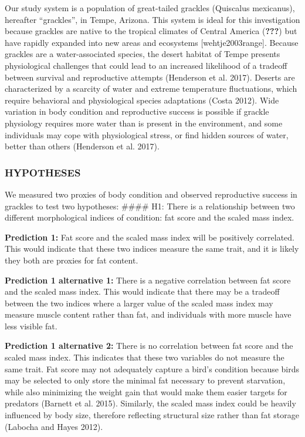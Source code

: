 \documentclass[
]{article}
\begin{document}
Our study system is a population of great-tailed grackles (Quiscalus
mexicanus), hereafter ``grackles'', in Tempe, Arizona. This system is
ideal for this investigation because grackles are native to the tropical
climates of Central America ({\textbf{???}}) but have rapidly expanded
into new areas and ecosystems {[}wehtje2003range{]}. Because grackles
are a water-associated species, the desert habitat of Tempe presents
physiological challenges that could lead to an increased likelihood of a
tradeoff between survival and reproductive attempts (Henderson et al.
2017). Deserts are characterized by a scarcity of water and extreme
temperature fluctuations, which require behavioral and physiological
species adaptations (Costa 2012). Wide variation in body condition and
reproductive success is possible if grackle physiology requires more
water than is present in the environment, and some individuals may cope
with physiological stress, or find hidden sources of water, better than
others (Henderson et al. 2017).

\hypertarget{hypotheses}{%
\subsubsection{HYPOTHESES}\label{hypotheses}}

We measured two proxies of body condition and observed reproductive
success in grackles to test two hypotheses: \#\#\#\# H1: There is a
relationship between two different morphological indices of condition:
fat score and the scaled mass index.

\textbf{Prediction 1:} Fat score and the scaled mass index will be
positively correlated. This would indicate that these two indices
measure the same trait, and it is likely they both are proxies for fat
content.

\textbf{Prediction 1 alternative 1:} There is a negative correlation
between fat score and the scaled mass index. This would indicate that
there may be a tradeoff between the two indices where a larger value of
the scaled mass index may measure muscle content rather than fat, and
individuals with more muscle have less visible fat.

\textbf{Prediction 1 alternative 2:} There is no correlation between fat
score and the scaled mass index. This indicates that these two variables
do not measure the same trait. Fat score may not adequately capture a
bird's condition because birds may be selected to only store the minimal
fat necessary to prevent starvation, while also minimizing the weight
gain that would make them easier targets for predators (Barnett et al.
2015). Similarly, the scaled mass index could be heavily influenced by
body size, therefore reflecting structural size rather than fat storage
(Labocha and Hayes 2012).
\end{document}

